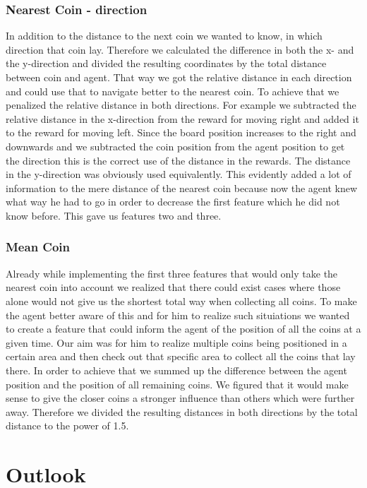 \documentclass[12pt, a4paper, bibliography=totoc]{scrreprt}
\begin{document}
\subsection{Nearest Coin - direction} 
In addition to the distance to the next coin we wanted to know, in which direction that coin lay. Therefore we calculated the difference in both the x- and the y-direction and divided the resulting coordinates by the total distance between coin and agent. That way we got the relative distance in each direction and could use that to navigate better to the nearest coin. To achieve that we penalized the relative distance in both directions. For example we subtracted the relative distance in the x-direction from the reward for moving right and added it to the reward for moving left. Since the board position increases to the right and downwards and we subtracted the coin position from the agent position to get the direction this is the correct use of the distance in the rewards. The distance in the y-direction was obviously used equivalently. This evidently added a lot of information to the mere distance of the nearest coin because now the agent knew what way he had to go in order to decrease the first feature which he did not know before. This gave us features two and three.

\subsection{Mean Coin}
Already while implementing the first three features that would only take the nearest coin into account we realized that there could exist cases where those alone would not give us the shortest total way when collecting all coins. To make the agent better aware of this and for him to realize such situiations we wanted to create a feature that could inform the agent of the position of all the coins at a given time. Our aim was for him to realize multiple coins being positioned in a certain area and then check out that specific area to collect all the coins that lay there. In order to achieve that we summed up the difference between the agent position and the position of all remaining coins. We figured that it would make sense to give the closer coins a stronger influence than others which were further away. Therefore we divided the resulting distances in both directions by the total distance to the power of 1.5.


\chapter{Outlook}


\appendix
\printbibliography
\end{document}
